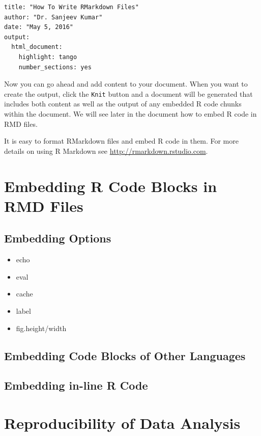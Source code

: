 \documentclass[]{krantz}
\providecommand{\tightlist}{%
  \setlength{\itemsep}{0pt}\setlength{\parskip}{0pt}}
\begin{document}
\begin{verbatim}
title: "How To Write RMarkdown Files"
author: "Dr. Sanjeev Kumar"
date: "May 5, 2016"
output:
  html_document: 
    highlight: tango
    number_sections: yes
\end{verbatim}

Now you can go ahead and add content to your document. When you want to
create the output, click the \texttt{Knit} button and a document will be
generated that includes both content as well as the output of any
embedded R code chunks within the document. We will see later in the
document how to embed R code in RMD files.

It is easy to format RMarkdown files and embed R code in them. For more
details on using R Markdown see \url{http://rmarkdown.rstudio.com}.

\section{Embedding R Code Blocks in RMD
Files}\label{embedding-r-code-blocks-in-rmd-files-1}

\subsection{Embedding Options}\label{embedding-options-1}

\begin{itemize}
\tightlist
\item
  echo
\item
  eval
\item
  cache
\item
  label
\item
  fig.height/width
\end{itemize}

\subsection{Embedding Code Blocks of Other
Languages}\label{embedding-code-blocks-of-other-languages-1}

\subsection{Embedding in-line R Code}\label{embedding-in-line-r-code-1}

\section{Reproducibility of Data
Analysis}\label{reproducibility-of-data-analysis-1}
\end{document}
